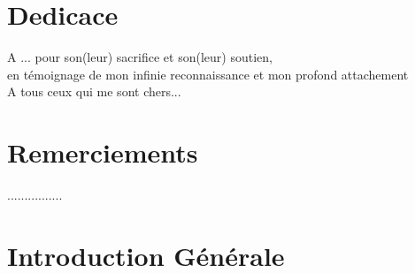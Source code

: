 \documentclass[a4paper, oneside, 12pt, final]{extreport}
\begin{document}

\chapter*{Dedicace}
\thispagestyle{empty}

  

\begin{center}
{\it 
	
A ... pour son(leur) sacrifice et son(leur) soutien, \\
en témoignage de mon infinie reconnaissance et mon profond attachement \\
\vspace{1cm}
A tous ceux qui me sont chers...

}
\end{center}
 
\chapter*{Remerciements}
 
\thispagestyle{empty}
 
................ 


\tableofcontents
 

\listoffigures
 
\listoftables
 
\listofalgorithms
{}
 



\printglossaries
 

\newpage

  \chapter*{Introduction Générale}
\label{chap:introduction}

\end{document}
